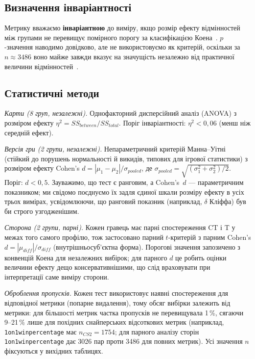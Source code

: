\subsection{Визначення інваріантності}

Метрику вважаємо \textbf{інваріантною} до виміру, якщо розмір ефекту відмінностей між групами не
перевищує помірного порогу за класифікацією Коена~\cite{Cohen}. $p$-значення наводимо довідково,
але не використовуємо як критерій, оскільки за $n \approx 3486$ воно майже завжди вказує на
значущість незалежно від практичної величини відмінностей~\cite{Cohen,Sullivan}.

\subsection{Статистичні методи}

\textit{Карти (8 груп, незалежні).} Однофакторний дисперсійний аналіз (ANOVA) з розміром ефекту
$\eta^2 = SS_{between} / SS_{total}$. Поріг інваріантності: $\eta^2 < 0{,}06$ (менш ніж середній
ефект).

\textit{Версія гри (2 групи, незалежні).} Непараметричний критерій Манна--Уітні (стійкий до
порушень нормальності й викидів, типових для ігрової статистики) з розміром ефекту
Cohen's $d = |\mu_1 - \mu_2| / \sigma_{pooled}$, де
$\sigma_{pooled} = \sqrt{(\sigma_1^2 + \sigma_2^2)/2}$. Поріг: $d < 0{,}5$. Зауважимо, що тест є
ранговим, а Cohen's~$d$ --- параметричним показником; ми свідомо поєднуємо їх задля єдиної шкали
розміру ефекту в усіх трьох вимірах, усвідомлюючи, що ранговий показник (наприклад, $\delta$
Кліффа) був би строго узгодженішим.

\textit{Сторона (2 групи, парні).} Кожен гравець має парні спостереження CT і T у межах того
самого профілю, тож застосовано парний $t$-критерій з парним
Cohen's $d = |\mu_{diff}| / \sigma_{diff}$ (внутрішньосуб'єктна форма). Порогові значення
запозичено з конвенцій Коена для незалежних вибірок; для парного $d$ це робить оцінки величини
ефекту дещо консервативнішими, що слід враховувати при інтерпретації саме виміру сторони.

\textit{Оброблення пропусків.} Кожен тест використовує наявні спостереження для відповідної
метрики (попарне видалення), тому обсяг вибірки залежить від метрики: для більшості метрик частка
пропусків не перевищувала 1\,\%, сягаючи 9--21\,\% лише для похідних снайперських відсоткових
метрик (наприклад, \texttt{1on1\us{}win\us{}percentage} має $n_{CS2} = 1754$; для парного аналізу
сторін \texttt{1on1\us{}win\us{}percentage} дає 3026 пар проти 3486 для повних метрик). Усі значення
$n$ фіксуються у вихідних таблицях.

